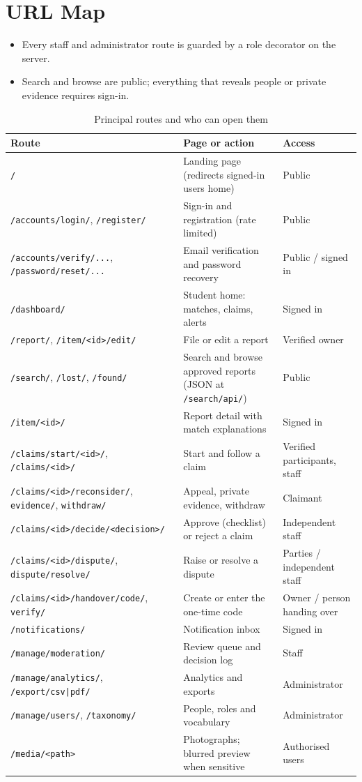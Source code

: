 \documentclass[12pt,a4paper,oneside]{report}
\newcommand{\code}[1]{\texttt{#1}}
\begin{document}
\section{URL Map}
\begin{itemize}
  \item Every staff and administrator route is guarded by a role decorator on the server.
  \item Search and browse are public; everything that reveals people or private evidence requires sign-in.
\end{itemize}
\begin{table}[H]
\centering\small
\caption{Principal routes and who can open them}
\begin{tabularx}{\textwidth}{P{64mm}X P{25mm}}
\toprule
Route & Page or action & Access\\
\midrule
\code{/} & Landing page (redirects signed-in users home) & Public\\
\code{/accounts/login/}, \code{/register/} & Sign-in and registration (rate limited) & Public\\
\code{/accounts/verify/...}, \code{/password/reset/...} & Email verification and password recovery & Public / signed in\\
\code{/dashboard/} & Student home: matches, claims, alerts & Signed in\\
\code{/report/}, \code{/item/<id>/edit/} & File or edit a report & Verified owner\\
\code{/search/}, \code{/lost/}, \code{/found/} & Search and browse approved reports (JSON at \code{/search/api/}) & Public\\
\code{/item/<id>/} & Report detail with match explanations & Signed in\\
\code{/claims/start/<id>/}, \code{/claims/<id>/} & Start and follow a claim & Verified participants, staff\\
\code{/claims/<id>/reconsider/}, \code{evidence/}, \code{withdraw/} & Appeal, private evidence, withdraw & Claimant\\
\code{/claims/<id>/decide/<decision>/} & Approve (checklist) or reject a claim & Independent staff\\
\code{/claims/<id>/dispute/}, \code{dispute/resolve/} & Raise or resolve a dispute & Parties / independent staff\\
\code{/claims/<id>/handover/code/}, \code{verify/} & Create or enter the one-time code & Owner / person handing over\\
\code{/notifications/} & Notification inbox & Signed in\\
\code{/manage/moderation/} & Review queue and decision log & Staff\\
\code{/manage/analytics/}, \code{/export/csv|pdf/} & Analytics and exports & Administrator\\
\code{/manage/users/}, \code{/taxonomy/} & People, roles and vocabulary & Administrator\\
\code{/media/<path>} & Photographs; blurred preview when sensitive & Authorised users\\
\bottomrule
\end{tabularx}
\end{table}
\end{document}
